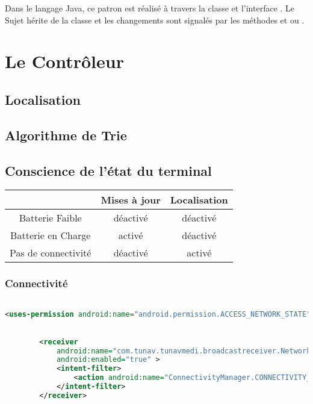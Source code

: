 Dans le langage Java, ce patron est réalisé à travers la classe  et l'interface . Le Sujet hérite de la classe  et les changements sont signalés par les méthodes  et  ou .


\section{Le Contrôleur}

\subsection{Localisation}

\subsection{Algorithme de Trie}

\subsection{Conscience de l'état du terminal}

\begin{table}[H]
\centering
\begin{tabular}{|c|c|c|}
\hline
&\textsf{Mises à jour} & \textsf{Localisation}\\
\hline
\textsf{Batterie Faible} & déactivé & déactivé\\
\hline
\textsf{Batterie en Charge} & activé & déactivé\\
\hline
\textsf{Pas de connectivité} & déactivé & activé\\
\hline
\end{tabular}
\end{table}

\subsubsection{Connectivité}

\begin{lstlisting}[language=xml, caption=Permission d’accès à l’état des interfaces réseaux.]

<uses-permission android:name="android.permission.ACCESS_NETWORK_STATE" />

\end{lstlisting}

\begin{lstlisting}[language=xml, caption=Enregistrement du  NetworkReceiver aux événements liée au status des interfaces réseaux.]

        <receiver
            android:name="com.tunav.tunavmedi.broadcastreceiver.NetworkReceiver"
            android:enabled="true" >
            <intent-filter>
                <action android:name="ConnectivityManager.CONNECTIVITY_ACTION" />
            </intent-filter>
        </receiver>

\end{lstlisting}

